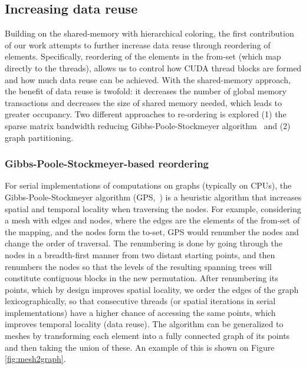 \subsection{Increasing data reuse}\label{increasing-data-reuse}
\noindent Building on the shared-memory with hierarchical coloring, the first 
contribution of our work attempts to further increase data reuse through 
reordering of elements. Specifically, reordering of the elements in the
from-set (which map directly to the threads), allows us to control 
how CUDA thread blocks are formed and how much data reuse can be achieved. 
With the shared-memory approach, the benefit of data reuse is twofold: it 
decreases the number of global memory transactions and decreases the size of 
shared memory needed, which leads to greater occupancy. Two different 
approaches to re-ordering is explored (1) the sparse matrix bandwidth reducing 
Gibbs-Poole-Stockmeyer algorithm~\cite{gps} and (2) graph partitioning.


\subsubsection{Gibbs-Poole-Stockmeyer-based reordering}

\noindent For serial implementations of computations on graphs (typically on 
CPUs), the Gibbs-Poole-Stockmeyer algorithm (GPS,~\cite{gps}) is a heuristic 
algorithm that increases spatial and temporal locality when traversing the 
nodes. For example, considering a mesh with edges and nodes, where the edges are 
the elements of the from-set of the mapping, and the nodes form the to-set, GPS 
would renumber the nodes and change the order of traversal. The renumbering is 
done by going through the nodes in a breadth-first manner from two distant 
starting points, and then renumbers the nodes so that the levels of the 
resulting spanning trees will constitute contiguous blocks in the new 
permutation. After renumbering its points, which by design improves spatial 
locality, we order the edges of the graph lexicographically, so that consecutive 
threads (or spatial iterations in serial implementations) have a higher chance 
of accessing the same points, which improves temporal locality (data reuse). 
The algorithm can be generalized to meshes by transforming each element into a
fully connected graph of its points and then taking the union of these. An
example of this is shown on Figure \ref{fig:mesh2graph}.

